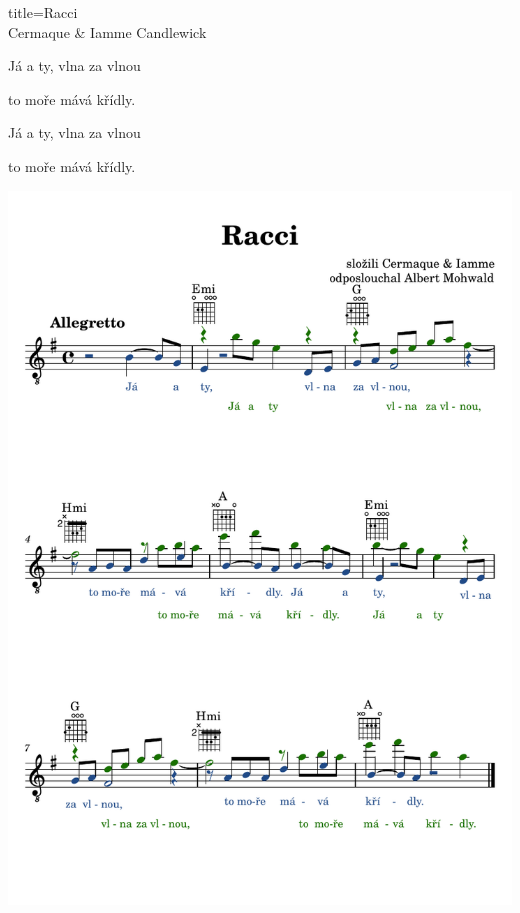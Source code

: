 \begin{song}{title=\predtitle\centering Racci\\\large Cermaque \& Iamme Candlewick  \vspace*{-0.3cm}}
\begin{centerjustified}
    Já a ty, vlna za vlnou
    
    to moře mává křídly.
    
    Já a ty, vlna za vlnou
    
    to moře mává křídly.
\end{centerjustified}

\newpage
\centering
\includegraphics[scale=1.1]{../taby/racci-komplet.pdf}

\setcounter{Slokočet}{0}
\end{song}
